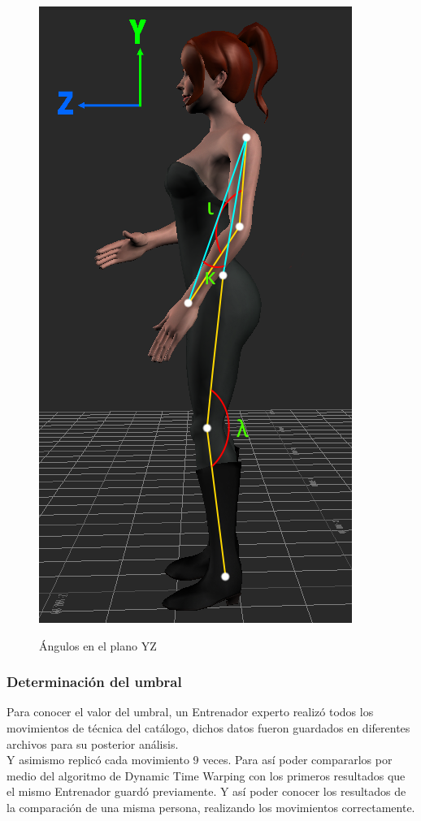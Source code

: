 \begin{figure}[H]
{		\includegraphics[scale=0.45]{./Figuras/Implementacion/AngulosYZ2}}
	\caption{Ángulos en el plano YZ}
	\label{fig:AngulosYZ}
\end{figure}

\subsubsection{Determinación del umbral}
\label{sec:Umbral}
Para conocer el valor del umbral, un Entrenador experto realizó todos los movimientos de técnica del catálogo, dichos datos fueron guardados en diferentes archivos para su posterior análisis.\\
Y asimismo replicó cada movimiento 9 veces. Para así poder compararlos por medio del algoritmo de Dynamic Time Warping con los primeros resultados que el mismo Entrenador guardó previamente. Y así poder conocer los resultados de la comparación de una misma persona, realizando los movimientos correctamente.\\

